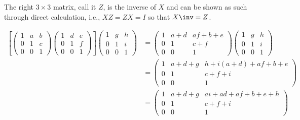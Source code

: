 \begin{problems}
\begin{solalph}
        The right $3 \times 3$ matrix, call it $Z$, is the inverse of $X$ and can be shown as such through direct calculation, i.e., $XZ = ZX = I$ so that $X\inv = Z$.
        \item 
        \begin{align*}
            \left[\begin{pmatrix}
                1 & a & b \\
                0 & 1 & c \\
                0 & 0 & 1
            \end{pmatrix}
            \begin{pmatrix}
                1 & d & e \\
                0 & 1 & f \\
                0 & 0 & 1
            \end{pmatrix}\right]
            \begin{pmatrix}
                1 & g & h \\
                0 & 1 & i \\
                0 & 0 & 1
            \end{pmatrix} & = 
            \begin{pmatrix}
                1 & a + d & af + b + e \\
                0 & 1 & c + f \\
                0 & 0 & 1
            \end{pmatrix}
            \begin{pmatrix}
                1 & g & h \\
                0 & 1 & i \\
                0 & 0 & 1
            \end{pmatrix} \\
            & = 
            \begin{pmatrix}
                1 & a + d + g & h + i(a + d) + af + b + e\\
                0 & 1 & c + f + i\\
                0 & 0 & 1
            \end{pmatrix} \\
            & = 
            \begin{pmatrix}
                1 & a + d + g & ai + ad + af + b + e + h \\
                0 & 1 & c + f + i \\
                0 & 0 & 1
            \end{pmatrix} \\

\end{align*}
\end{solalph}
\end{problems}
